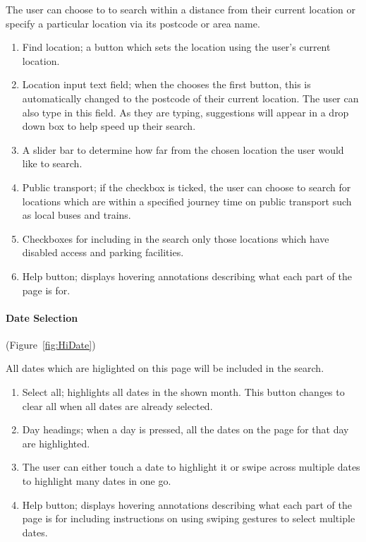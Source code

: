 The user can choose to to search within a distance from their current
location or specify a particular location via its postcode or area
name.
\begin{enumerate}
	\item Find location; a button which sets the location using the user's
		current location.
	\item Location input text field; when the chooses the first button, this
		is automatically changed to the postcode of their current location.
		The user can also type in this field. As they are typing, suggestions
		will appear in a drop down box to help speed up their search.
	\item A slider bar to determine how far from the chosen location the user
		would like to search.
	\item Public transport; if the checkbox is ticked, the user can choose
		to search for locations which are within a specified journey time
		on public transport such as local buses and trains.
	\item Checkboxes for including in the search only those locations which
		have disabled access and parking facilities.
	\item Help button; displays hovering annotations describing what each part
		of the page is for.
\end{enumerate}

\paragraph{Date Selection} (Figure~\ref{fig:HiDate})


All dates which are higlighted on this page will be included in the
search.
\begin{enumerate}
	\item Select all; highlights all dates in the shown month. This button
		changes to clear all when all dates are already selected.
	\item Day headings; when a day is pressed, all the dates on the page for
		that day are highlighted.
	\item The user can either touch a date to highlight it or swipe across multiple
		dates to highlight many dates in one go.
	\item Help button; displays hovering annotations describing what each part
		of the page is for including instructions on using swiping gestures
		to select multiple dates.
\end{enumerate}

